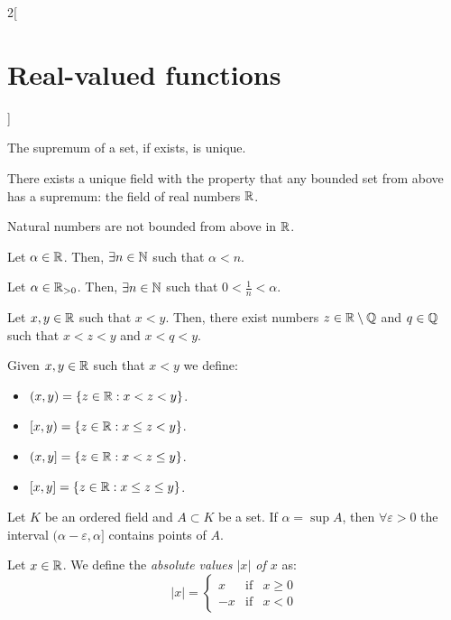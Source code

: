 \documentclass[../../../main.tex]{subfiles}
\begin{document}
\begin{multicols}{2}[\section{Real-valued functions}]
\begin{prop}
\end{prop}
\begin{prop}
    The supremum of a set, if exists, is unique.
\end{prop}
\begin{theorem}
    There exists a unique field with the property that any bounded set from above has a supremum: the field of real numbers $\mathbb{R}$.
\end{theorem}
\begin{prop}
    Natural numbers are not bounded from above in $\mathbb{R}$.
\end{prop}
\begin{corollary}
    Let $\alpha\in\mathbb{R}$. Then, $\exists n\in\mathbb{N}$ such that $\alpha<n$.
\end{corollary}
\begin{corollary}
    Let $\alpha\in\mathbb{R}_{>0}$. Then, $\exists n\in\mathbb{N}$ such that $0<\frac{1}{n}<\alpha$.
\end{corollary}
\begin{prop}
    Let $x,y\in\mathbb{R}$ such that $x<y$. Then, there exist numbers $z\in\mathbb{R}\setminus\mathbb{Q}$ and $q\in\mathbb{Q}$ such that $x<z<y$ and $x<q<y$.
\end{prop}
\begin{definition}
    Given $x,y\in\mathbb{R}$ such that $x<y$ we define:
    \begin{itemize}
        \item $(x,y)=\{z\in\mathbb{R}:x<z<y\}$.
        \item $[x,y)=\{z\in\mathbb{R}:x\leq z<y\}$.
        \item $(x,y]=\{z\in\mathbb{R}:x<z\leq y\}$.
        \item $[x,y]=\{z\in\mathbb{R}:x\leq z\leq y\}$.
    \end{itemize}
\end{definition}
\begin{lemma}
    Let $K$ be an ordered field and $A\subset K$ be a set. If $\alpha=\sup A$, then $\forall \varepsilon>0$ the interval $(\alpha-\varepsilon,\alpha]$ contains points of $A$.
\end{lemma}
\begin{definition}
    Let $x\in\mathbb{R}$. We define the \textit{absolute values $|x|$ of $x$} as:
    \begin{equation*}
        |x|=\left\{
        \begin{array}{ccc}
            x & \text{if} & x\geq 0\\
            -x & \text{if} & x<0
        \end{array}

\end{equation*}
\end{definition}
\end{multicols}
\end{document}
